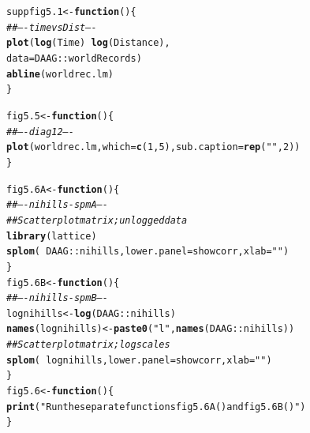 \documentclass[12pt, a4paper,  BCOR=8.25mm, DIV=15]{scrartcl}\usepackage[]{graphicx}\usepackage[]{color}
\makeatletter
\newcommand{\hlnum}[1]{\textcolor[rgb]{0.686,0.059,0.569}{#1}}%
\newcommand{\hlstr}[1]{\textcolor[rgb]{0.192,0.494,0.8}{#1}}%
\newcommand{\hlcom}[1]{\textcolor[rgb]{0.678,0.584,0.686}{\textit{#1}}}%
\newcommand{\hlopt}[1]{\textcolor[rgb]{0,0,0}{#1}}%
\newcommand{\hlstd}[1]{\textcolor[rgb]{0.345,0.345,0.345}{#1}}%
\newcommand{\hlkwa}[1]{\textcolor[rgb]{0.161,0.373,0.58}{\textbf{#1}}}%
\newcommand{\hlkwb}[1]{\textcolor[rgb]{0.69,0.353,0.396}{#1}}%
\newcommand{\hlkwc}[1]{\textcolor[rgb]{0.333,0.667,0.333}{#1}}%
\newcommand{\hlkwd}[1]{\textcolor[rgb]{0.737,0.353,0.396}{\textbf{#1}}}%
\newenvironment{kframe}{%
 \def\at@end@of@kframe{}%
 \ifinner\ifhmode%
  \def\at@end@of@kframe{\end{minipage}}%
  \begin{minipage}{\columnwidth}%
 \fi\fi%
 \def\FrameCommand##1{\hskip\@totalleftmargin \hskip-\fboxsep
 \colorbox{shadecolor}{##1}\hskip-\fboxsep
     \hskip-\linewidth \hskip-\@totalleftmargin \hskip\columnwidth}%
 \MakeFramed {\advance\hsize-\width
   \@totalleftmargin\z@ \linewidth\hsize
   \@setminipage}}%
 {\par\unskip\endMakeFramed%
 \at@end@of@kframe}
\newenvironment{knitrout}{}{} %
\makeatother
\begin{document}
\begin{knitrout}
\color{fgcolor}\begin{kframe}
\begin{alltt}
\hlstd{suppfig5.1} \hlkwb{<-} \hlkwa{function}\hlstd{()\{}
\hlcom{## ---- timevsDist ----}
\hlkwd{plot}\hlstd{(}\hlkwd{log}\hlstd{(Time)} \hlopt{~} \hlkwd{log}\hlstd{(Distance),}
     \hlkwc{data} \hlstd{= DAAG}\hlopt{::}\hlstd{worldRecords)}
\hlkwd{abline}\hlstd{(worldrec.lm)}
\hlstd{\}}
\end{alltt}
\end{kframe}
\end{knitrout}

\begin{knitrout}
\color{fgcolor}\begin{kframe}
\begin{alltt}
\hlstd{fig5.5} \hlkwb{<-} \hlkwa{function}\hlstd{()\{}
\hlcom{## ---- diag12 ----}
\hlkwd{plot}\hlstd{(worldrec.lm,} \hlkwc{which}\hlstd{=}\hlkwd{c}\hlstd{(}\hlnum{1}\hlstd{,}\hlnum{5}\hlstd{),} \hlkwc{sub.caption}\hlstd{=}\hlkwd{rep}\hlstd{(}\hlstr{""}\hlstd{,}\hlnum{2}\hlstd{))}
\hlstd{\}}
\end{alltt}
\end{kframe}
\end{knitrout}



\begin{knitrout}
\color{fgcolor}\begin{kframe}
\begin{alltt}
\hlstd{fig5.6A} \hlkwb{<-} \hlkwa{function}\hlstd{()\{}
\hlcom{## ---- nihills-spmA ----}
\hlcom{## Scatterplot matrix; unlogged data}
\hlkwd{library}\hlstd{(lattice)}
\hlkwd{splom}\hlstd{(}\hlopt{~}\hlstd{DAAG}\hlopt{::}\hlstd{nihills,}  \hlkwc{lower.panel}\hlstd{=showcorr,} \hlkwc{xlab}\hlstd{=}\hlstr{""}\hlstd{)}
\hlstd{\}}
\hlstd{fig5.6B} \hlkwb{<-} \hlkwa{function}\hlstd{()\{}
\hlcom{## ---- nihills-spmB ----}
\hlstd{lognihills} \hlkwb{<-} \hlkwd{log}\hlstd{(DAAG}\hlopt{::}\hlstd{nihills)}
\hlkwd{names}\hlstd{(lognihills)} \hlkwb{<-} \hlkwd{paste0}\hlstd{(}\hlstr{"l"}\hlstd{,} \hlkwd{names}\hlstd{(DAAG}\hlopt{::}\hlstd{nihills))}
\hlcom{## Scatterplot matrix; log scales}
\hlkwd{splom}\hlstd{(}\hlopt{~} \hlstd{lognihills,} \hlkwc{lower.panel}\hlstd{=showcorr,} \hlkwc{xlab}\hlstd{=}\hlstr{""}\hlstd{)}
\hlstd{\}}
\hlstd{fig5.6} \hlkwb{<-} \hlkwa{function}\hlstd{()\{}
  \hlkwd{print}\hlstd{(}\hlstr{"Run the separate functions fig5.6A() and fig5.6B()"}\hlstd{)}
\hlstd{\}}
\end{alltt}
\end{kframe}
\end{knitrout}
\end{document}
